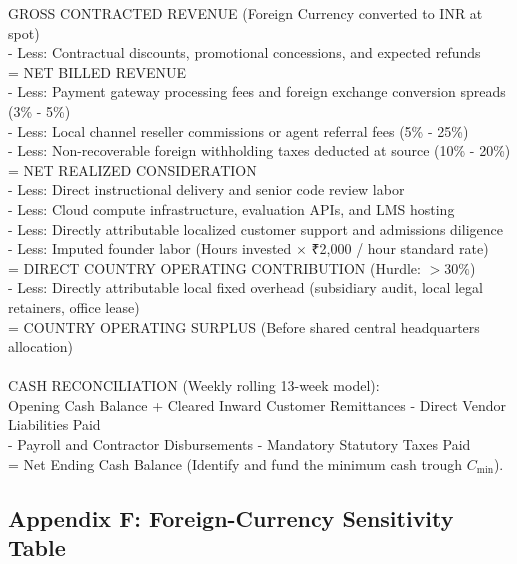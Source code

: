 \begin{tcolorbox}[colback=BayesCanvas,colframe=BayesDark,arc=1mm,title=\textbf{The Standard Country-Level P\&L and Cash Flow Architecture}]
\scriptsize\ttfamily
GROSS CONTRACTED REVENUE (Foreign Currency converted to INR at spot)\\
- Less: Contractual discounts, promotional concessions, and expected refunds\\
= NET BILLED REVENUE\\
- Less: Payment gateway processing fees and foreign exchange conversion spreads (3\% - 5\%)\\
- Less: Local channel reseller commissions or agent referral fees (5\% - 25\%)\\
- Less: Non-recoverable foreign withholding taxes deducted at source (10\% - 20\%)\\
= NET REALIZED CONSIDERATION\\
- Less: Direct instructional delivery and senior code review labor\\
- Less: Cloud compute infrastructure, evaluation APIs, and LMS hosting\\
- Less: Directly attributable localized customer support and admissions diligence\\
- Less: Imputed founder labor (Hours invested $\times$ \textnormal{₹}2,000 / hour standard rate)\\
= DIRECT COUNTRY OPERATING CONTRIBUTION (Hurdle: $>30\%$)\\
- Less: Directly attributable local fixed overhead (subsidiary audit, local legal retainers, office lease)\\
= COUNTRY OPERATING SURPLUS (Before shared central headquarters allocation)\\
\\
CASH RECONCILIATION (Weekly rolling 13-week model):\\
Opening Cash Balance + Cleared Inward Customer Remittances - Direct Vendor Liabilities Paid\\
- Payroll and Contractor Disbursements - Mandatory Statutory Taxes Paid\\
= Net Ending Cash Balance (Identify and fund the minimum cash trough $C_{\text{min}}$).
\end{tcolorbox}

\subsection{Appendix F: Foreign-Currency Sensitivity Table}


